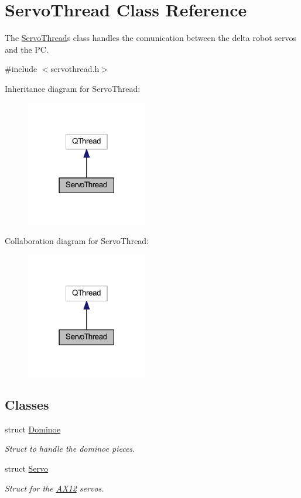 \hypertarget{a00008}{}\section{Servo\+Thread Class Reference}
\label{a00008}


The \hyperlink{a00008}{Servo\+Thread}\textquotesingle{}s class handles the comunication between the delta robot servos and the P\+C.  




{\ttfamily \#include $<$servothread.\+h$>$}



Inheritance diagram for Servo\+Thread\+:\nopagebreak
\begin{figure}[H]
\begin{center}
\leavevmode
\includegraphics[width=150pt]{d1/dc6/a00037}
\end{center}
\end{figure}


Collaboration diagram for Servo\+Thread\+:\nopagebreak
\begin{figure}[H]
\begin{center}
\leavevmode
\includegraphics[width=150pt]{d8/d41/a00038}
\end{center}
\end{figure}
\subsection*{Classes}
\begin{DoxyCompactItemize}
\item 
struct \hyperlink{a00002}{Dominoe}
\begin{DoxyCompactList}\small\item\em Struct to handle the dominoe pieces. \end{DoxyCompactList}\item 
struct \hyperlink{a00007}{Servo}
\begin{DoxyCompactList}\small\item\em Struct for the \hyperlink{a00001}{A\+X12} servos. \end{DoxyCompactList}\end{DoxyCompactItemize}
